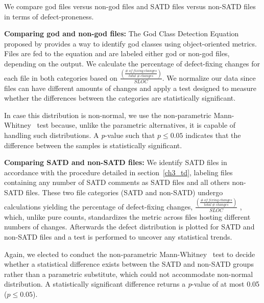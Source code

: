 We compare god files versus non-god files and SATD files versus non-SATD files in terms of defect-proneness.


\noindent\textbf{Comparing god and non-god files:}
The God Class Detection Equation proposed by \cite{marinescu2004detection} provides a way to identify god classes using object-oriented metrics. Files are fed to the equation and are labeled either god or non-god files, depending on the output. We calculate the percentage of defect-fixing changes for each file in both categories based on $\frac{\left (\frac{\#~of~fixing~changes}{total~\#~changes} \right )}{SLOC}$. We normalize our data since files can have different amounts of changes and apply a test designed to measure whether the differences between the categories are statistically significant.

In case this distribution is non-normal, we use the non-parametric Mann-Whitney~\cite{mann1947test} test because, unlike the parametric alternatives, it is capable of handling such distributions. A \textit{p}-value such that $p \le 0.05$ indicates that the difference between the samples is statistically significant.


\noindent\textbf{Comparing SATD and non-SATD files:}
We identify SATD files in accordance with the procedure detailed in section~\ref{ch3_td}, labeling files containing any number of SATD comments as SATD files and all others non-SATD files. These two file categories (SATD and non-SATD) undergo calculations yielding the percentage of defect-fixing changes, $\frac{\left (\frac{\#~of~fixing~changes}{total~\#~changes} \right )}{SLOC}$ , which, unlike pure counts, standardizes the metric across files hosting different numbers of changes. Afterwards the defect distribution is plotted for SATD and non-SATD files and a test is performed to uncover any statistical trends.

Again, we elected to conduct the non-parametric Mann-Whitney~\cite{mann1947test} test to decide whether a statistical difference exists between the SATD and non-SATD groups rather than a parametric substitute, which could not accommodate non-normal distribution. A statistically significant difference returns a \textit{p}-value of at most 0.05 ($p \le 0.05$).




